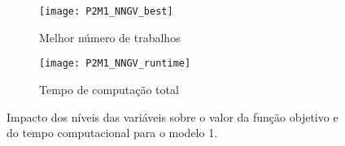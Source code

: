 \begin{figure}[H]
	\centering
	\begin{subfigure}{0.49\textwidth}
	\centering
		\texttt{[image: P2M1\_NNGV\_best]}
		\caption{Melhor número de trabalhos}
		\label{fig:P2M1_NNGV_best}
	\end{subfigure}
	\begin{subfigure}{0.49\textwidth}
	\centering
		\texttt{[image: P2M1\_NNGV\_runtime]}
		\caption{Tempo de computação total}
		\label{fig:P2M1_NNGV_runtime}
	\end{subfigure}
	\caption{Impacto dos níveis das variáveis sobre o valor da função objetivo e do tempo computacional para o modelo 1.}
	\label{fig:P2M1_NNGV_alt}
\end{figure}